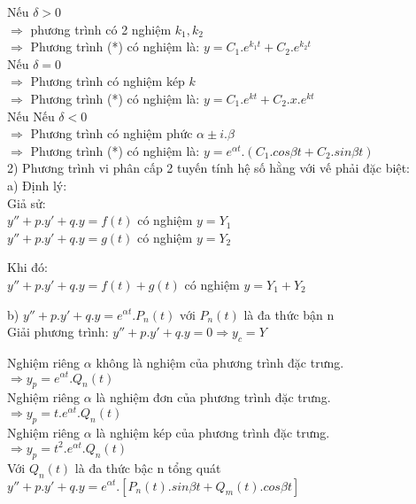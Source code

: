     Nếu $\delta > 0$ \\
    $\Rightarrow$ phương trình có 2 nghiệm $k_1, k_2$ \\
    $\Rightarrow$ Phương trình (*) có nghiệm là: $y= C_1.e^{k_1 t}+C_2.e^{k_2 t}$ \\

    Nếu $\delta = 0$ \\
    $\Rightarrow$ Phương trình có nghiệm kép $k$ \\
    $\Rightarrow$ Phương trình (*) có nghiệm là: $y = C_1.e^{kt}+C_2.x.e^{kt}$ \\

    Nếu Nếu $\delta < 0$ \\
    $\Rightarrow$ Phương trình có nghiệm phức $\alpha \pm i.\beta$ \\
    $\Rightarrow$ Phương trình (*) có nghiệm là: $y = e^{\alpha t}.(C_1.cos{\beta t} + C_2.sin{\beta t})$ \\

    2) Phương trình vi phân cấp 2 tuyến tính hệ số hằng với vế phải đặc biệt: \\
    a)    Định lý: \\

    Giả sử: \\
    $ y''+p.y'+q.y=f(t)$
    có nghiệm $y=Y_1$ \\
    $y''+p.y'+q.y=g(t)$
    có nghiệm $y=Y_2$

    Khi đó: \\
    $y''+p.y'+q.y=f(t)+g(t)$
    có nghiệm $y=Y_1+Y_2$

    b) $y''+p.y'+q.y=e^{\alpha t}.P_n (t)$ với $P_n(t)$ là đa thức bận n\\

    Giải phương trình: $y''+p.y'+q.y=0 \Rightarrow y_c=Y$

    Nghiệm riêng $\alpha$ không là nghiệm của phương trình đặc trưng. \\
    $\Rightarrow y_p=e^{\alpha t}.Q_n (t)$ \\

    Nghiệm riêng $\alpha$ là nghiệm đơn của phương trình đặc trưng. \\
    $\Rightarrow y_p=t.e^{\alpha t}.Q_n (t)$ \\

    Nghiệm riêng $\alpha$ là nghiệm kép của phương trình đặc trưng. \\
    $\Rightarrow y_p=t^2.e^{\alpha t}.Q_n (t)$ \\

    Với $Q_n (t)$ là đa thức bậc n tổng quát \\
    $y''+p.y'+q.y=e^{\alpha t}.[P_n(t).sin{\beta t}+Q_m (t).cos{\beta t} ]$ \\


